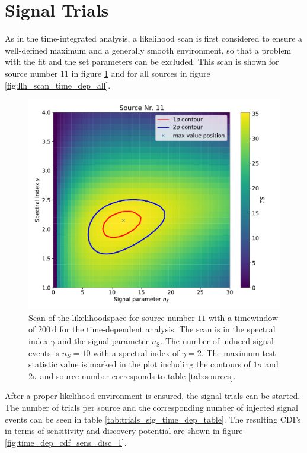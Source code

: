 \section{Signal Trials}

As in the time-integrated analysis, a likelihood scan is first considered to ensure a well-defined maximum and a generally smooth environment, so that a problem with the fit and the set parameters can be excluded.
This scan is shown for source number $\num{11}$ in figure \ref{fig:llh_scan_time_dep} and for all sources in figure \ref{fig:llh_scan_time_dep_all}.
\begin{figure}
    \centering
    \includegraphics[width=\linewidth]{Plots/05_csky/llh_scan_1.pdf}
    \caption{Scan of the likelihoodspace for source number $\num{11}$ with a timewindow of $\SI{200}{\day}$ for the time-dependent analysis. The scan is in the spectral index $\gamma$ and the signal parameter $n_\text{S}$. The number of induced signal events is $n_S = \num{10}$ with a spectral index of $\gamma = 2$. The maximum test statistic value is marked in the plot including the contours of $\num{1}\sigma$ and $\num{2}\sigma$ and source number corresponds to table \ref{tab:sources}.}
    \label{fig:llh_scan_time_dep}
\end{figure}
After a proper likelihood environment is ensured, the signal trials can be started.
The number of trials per source and the corresponding number of injected signal events can be seen in table \ref{tab:trials_sig_time_dep_table}.
The resulting CDFs in terms of sensitivity and discovery potential are shown in figure \ref{fig:time_dep_cdf_sens_disc_1}.
